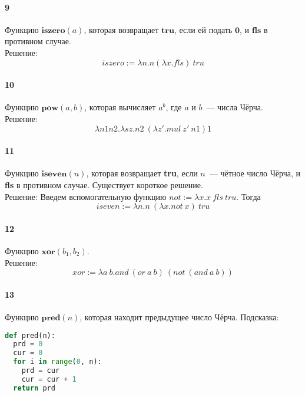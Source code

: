 \documentclass[12pt, a4paper] {article}
\begin{document}
  \paragraph{9} Функцию $\mathbf{iszero}(a)$, которая возвращает $\textbf{tru}$, если
    ей подать $\mathbf{0}$, и $\textbf{fls}$ в противном случае. \\
   Решение:
   $$ iszero := \lambda n. n (\lambda x.fls)\ tru  $$
  \paragraph{10} Функцию $\mathbf{pow}(a, b)$, которая вычисляет $a^b$, где $a$ и $b$~---
    числа Чёрча.\\
    Решение:
    $$ \lambda n1n2. \lambda sz. n2\ (\lambda z'. mul\ z'\ n1) 1   $$
  \paragraph{11} Функцию $\mathbf{iseven}(n)$, которая возвращает \textbf{tru}, если
    $n$~--- чётное число Чёрча, и \textbf{fls} в противном случае. Существует
    короткое решение. \\
    Решение:
    Введем вспомогательную функцию $ not := \lambda x. x\ fls\ tru $. Тогда  
    $$ iseven := \lambda n. n\ (\lambda x. not\  x)\ tru $$
  \paragraph{12} Функцию $\mathbf{xor}(b_1, b_2)$.\\
  Решение:
 $$ xor := \lambda a\ b. and\ (or\ a\ b)\ (not\ (and\ a\ b)) $$
  \paragraph{13} Функцию $\mathbf{pred}(n)$, которая находит предыдущее число Чёрча.
    Подсказка:
\begin{lstlisting}[language=Python]
def pred(n):
  prd = 0
  cur = 0
  for i in range(0, n):
    prd = cur
    cur = cur + 1
  return prd
\end{lstlisting}
\end{document}
